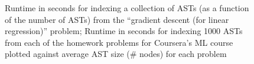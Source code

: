 \begin{figure}[t!]
\center
{}

\caption{ Runtime in seconds for indexing a collection of ASTs (as a function of the number of ASTs)
from the ``gradient descent (for linear regression)'' problem;
 Runtime in seconds for indexing 1000 ASTs from each of the homework problems for Coursera's ML course plotted
against average AST size (\# nodes) for each problem}
\end{figure}

